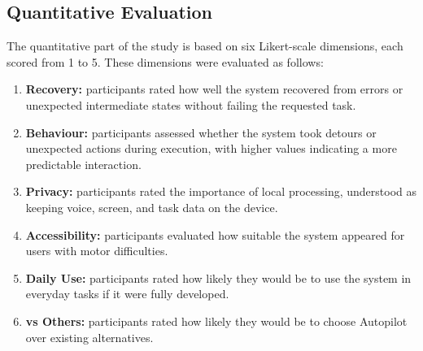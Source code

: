 \begin{table}[H]
\centering
{}
\caption{Setup of the user evaluation study.}
\label{tab:qualitative_setup}
\end{table}

\subsection{Quantitative Evaluation}

The quantitative part of the study is based on six Likert-scale dimensions, each scored from 1 to 5. These dimensions were evaluated as follows:

\begin{enumerate}
    \item \textbf{Recovery:} participants rated how well the system recovered from errors or unexpected intermediate states without failing the requested task.
    \item \textbf{Behaviour:} participants assessed whether the system took detours or unexpected actions during execution, with higher values indicating a more predictable interaction.
    \item \textbf{Privacy:} participants rated the importance of local processing, understood as keeping voice, screen, and task data on the device.
    \item \textbf{Accessibility:} participants evaluated how suitable the system appeared for users with motor difficulties.
    \item \textbf{Daily Use:} participants rated how likely they would be to use the system in everyday tasks if it were fully developed.
    \item \textbf{vs Others:} participants rated how likely they would be to choose Autopilot over existing alternatives.
\end{enumerate}

